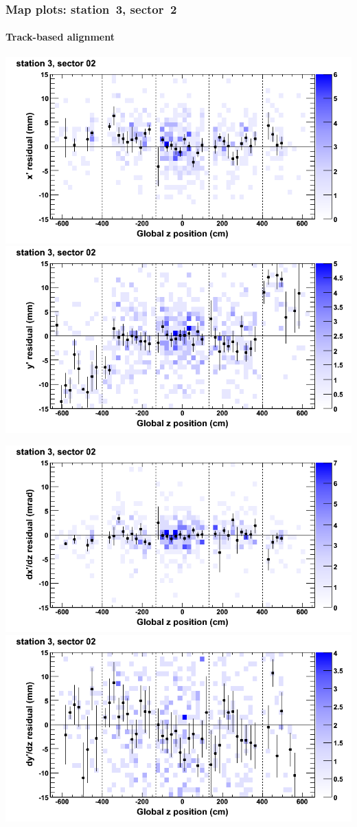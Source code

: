 \documentclass[compress]{beamer}
\begin{document}
\begin{frame}
\frametitle{Map plots: station~3, sector~2}
\framesubtitle{Track-based alignment}
\includegraphics[width=0.5\linewidth]{mapplots_re05/DTvsz_st3sec02_x.png}
\includegraphics[width=0.5\linewidth]{mapplots_re05/DTvsz_st3sec02_y.png}

\includegraphics[width=0.5\linewidth]{mapplots_re05/DTvsz_st3sec02_dxdz.png}
\includegraphics[width=0.5\linewidth]{mapplots_re05/DTvsz_st3sec02_dydz.png}
\end{frame}
\end{document}
